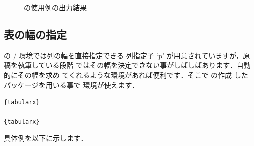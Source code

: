 \begin{figure}[htbp]
   \IOmargin
   \caption{の使用例の出力結果}%
\end{figure}


\subsection{表の幅の指定\zdash{}}
\LaTeXe の / 環境では列の幅を直接指定できる
列指定子 `\str p' が用意されていますが，原稿を執筆している段階
ではその幅を決定できない事がしばしばあります．自動的にその幅を求め
てくれるような環境があれば便利です．そこで の作成
した  パッケージを用いる事で  環境が使えます．
\begin{Syntax}
\verb|{tabularx}|\\
\\
\verb|{tabularx}| 
\end{Syntax}
具体例を以下に示します．


